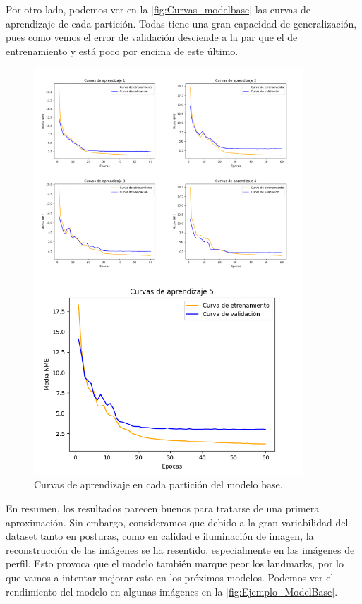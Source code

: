         \noindent Por otro lado, podemos ver en la \autoref{fig:Curvas_modelbase} las curvas de aprendizaje de cada partición. Todas tiene una gran capacidad de generalización, pues como vemos el error de validación desciende a la par que el de entrenamiento y está poco por encima de este último.

        \begin{figure}[H]
            \centering
            \includegraphics[width=0.9\textwidth]{img/curvas_aprendizaje_modelbase.png}
            \caption{Curvas de aprendizaje en cada partición del modelo base.}
            \label{fig:Curvas_modelbase}
        \end{figure}

        \noindent En resumen, los resultados parecen buenos para tratarse de una primera aproximación. Sin embargo, consideramos que debido a la gran variabilidad del dataset tanto en posturas, como en calidad e iluminación de imagen, la reconstrucción de las imágenes se ha resentido, especialmente en las imágenes de perfil. Esto provoca que el modelo también marque peor los landmarks, por lo que vamos a intentar mejorar esto en los próximos modelos. Podemos ver el rendimiento del modelo en algunas imágenes en la \autoref{fig:Ejemplo_ModelBase}.

